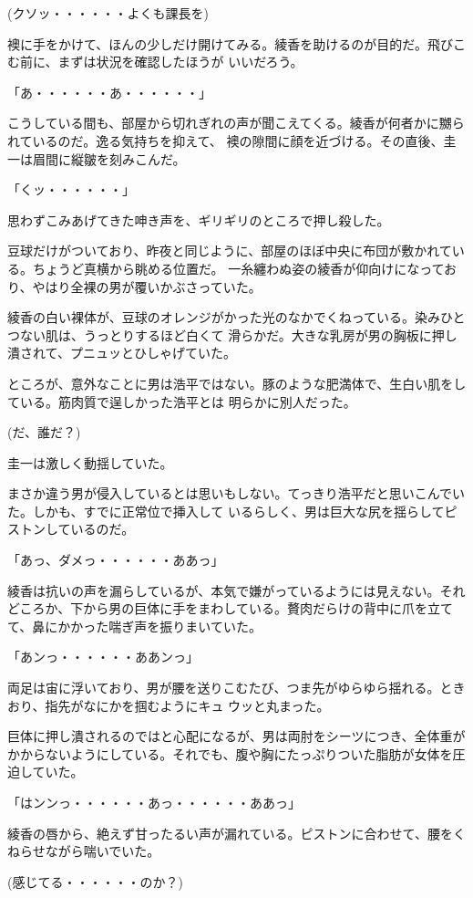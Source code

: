 ﻿\documentclass[book,tate]{jlreq}
\begin{document}
(クソッ・・・・・・よくも課長を)

襖に手をかけて、ほんの少しだけ開けてみる。綾香を助けるのが目的だ。飛びこむ前に、まずは状況を確認したほうが いいだろう。

「あ・・・・・・あ・・・・・・」

こうしている間も、部屋から切れぎれの声が聞こえてくる。綾香が何者かに嬲られているのだ。逸る気持ちを抑えて、 襖の隙間に顔を近づける。その直後、圭一は眉間に縦皺を刻みこんだ。

「くッ・・・・・・」

思わずこみあげてきた呻き声を、ギリギリのところで押し殺した。

豆球だけがついており、昨夜と同じように、部屋のほぼ中央に布団が敷かれている。ちょうど真横から眺める位置だ。 一糸纏わぬ姿の綾香が仰向けになっており、やはり全裸の男が覆いかぶさっていた。

綾香の白い裸体が、豆球のオレンジがかった光のなかでくねっている。染みひとつない肌は、うっとりするほど白くて 滑らかだ。大きな乳房が男の胸板に押し潰されて、プニュッとひしゃげていた。

ところが、意外なことに男は浩平ではない。豚のような肥満体で、生白い肌をしている。筋肉質で逞しかった浩平とは 明らかに別人だった。

(だ、誰だ？)

圭一は激しく動揺していた。

まさか違う男が侵入しているとは思いもしない。てっきり浩平だと思いこんでいた。しかも、すでに正常位で挿入して いるらしく、男は巨大な尻を揺らしてピストンしているのだ。

「あっ、ダメっ・・・・・・ああっ」

綾香は抗いの声を漏らしているが、本気で嫌がっているようには見えない。それどころか、下から男の巨体に手をまわしている。贅肉だらけの背中に爪を立てて、鼻にかかった喘ぎ声を振りまいていた。

「あンっ・・・・・・ああンっ」

両足は宙に浮いており、男が腰を送りこむたび、つま先がゆらゆら揺れる。ときおり、指先がなにかを掴むようにキュ ウッと丸まった。

巨体に押し潰されるのではと心配になるが、男は両肘をシーツにつき、全体重がかからないようにしている。それでも、腹や胸にたっぷりついた脂肪が女体を圧迫していた。

「はンンっ・・・・・・あっ・・・・・・ああっ」

綾香の唇から、絶えず甘ったるい声が漏れている。ピストンに合わせて、腰をくねらせながら喘いでいた。

(感じてる・・・・・・のか？)
\end{document}

